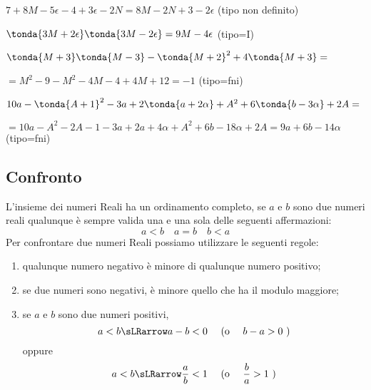  \begin{esempio}
\(7 +8M -5\epsilon  -4 +3\epsilon-2N = 8M -2N +3 -2\epsilon\)
\quad (tipo non definito)
 \end{esempio}
 
 \begin{esempio}
\(\tonda{3M +2\epsilon} \tonda{3M -2\epsilon} = 9M -4\epsilon\)
\quad (tipo=I)
 \end{esempio}
 
 \begin{esempio}
\(\tonda{M +3} \tonda{M -3} - \tonda{M+2}^2 +4\tonda{M +3}=\)

\(=M^2 -9 -M^2 -4M -4 +4M +12 = -1\)
\quad (tipo=fni)
 \end{esempio}
 
 \begin{esempio}
\(10a -\tonda{A +1}^2 -3a +2\tonda{a+2\alpha} +A^2 +6\tonda{b -3\alpha} 
+2A= 
\)

\(=10a -A^2 -2A -1 -3a +2a+4\alpha +A^2 +6b -18\alpha +2A = 9a +6b 
-14\alpha\) 
\quad (tipo=fni)
 \end{esempio}


\subsection{Confronto}
\label{subsec:insnum_confronto}

L'insieme dei numeri Reali ha un ordinamento completo, se \(a\) e \(b\) sono 
due numeri reali qualunque è sempre valida una e una sola delle seguenti 
affermazioni:
\[a<b \quad a=b \quad b<a\]
Per confrontare due numeri Reali possiamo utilizzare le seguenti regole:

\begin{enumerate} [noitemsep]
 \item qualunque numero negativo è minore di qualunque numero positivo;
 \item se due numeri sono negativi, è minore quello che ha il modulo 
maggiore;
 \item se \(a\) e \(b\) sono due numeri positivi, 
 \[a<b \sLRarrow a-b<0 \quad \text{ (o } \quad b-a>0 \text{ )}\]
oppure
 \[a<b \sLRarrow \frac{a}{b}<1 \quad \text{ (o } \quad \frac{b}{a}>1 
   \text{ )}\]
\end{enumerate}

